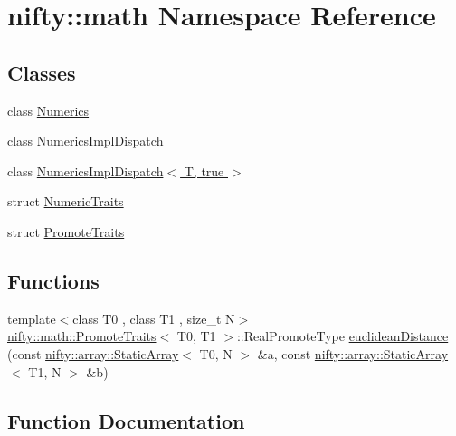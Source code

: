 \hypertarget{namespacenifty_1_1math}{}\section{nifty\+:\+:math Namespace Reference}
\label{namespacenifty_1_1math}
\subsection*{Classes}
\begin{DoxyCompactItemize}
\item 
class \hyperlink{classnifty_1_1math_1_1Numerics}{Numerics}
\item 
class \hyperlink{classnifty_1_1math_1_1NumericsImplDispatch}{Numerics\+Impl\+Dispatch}
\item 
class \hyperlink{classnifty_1_1math_1_1NumericsImplDispatch_3_01T_00_01true_01_4}{Numerics\+Impl\+Dispatch$<$ T, true $>$}
\item 
struct \hyperlink{structnifty_1_1math_1_1NumericTraits}{Numeric\+Traits}
\item 
struct \hyperlink{structnifty_1_1math_1_1PromoteTraits}{Promote\+Traits}
\end{DoxyCompactItemize}
\subsection*{Functions}
\begin{DoxyCompactItemize}
\item 
{\footnotesize template$<$class T0 , class T1 , size\+\_\+t N$>$ }\\\hyperlink{structnifty_1_1math_1_1PromoteTraits}{nifty\+::math\+::\+Promote\+Traits}$<$ T0, T1 $>$\+::Real\+Promote\+Type \hyperlink{namespacenifty_1_1math_a6abaaeb54bfe7300d2f3ae9186fe3ab0}{euclidean\+Distance} (const \hyperlink{namespacenifty_1_1array_a683f151f19c851754e0c6d55ed16a0c2}{nifty\+::array\+::\+Static\+Array}$<$ T0, N $>$ \&a, const \hyperlink{namespacenifty_1_1array_a683f151f19c851754e0c6d55ed16a0c2}{nifty\+::array\+::\+Static\+Array}$<$ T1, N $>$ \&b)
\end{DoxyCompactItemize}


\subsection{Function Documentation}
\hypertarget{namespacenifty_1_1math_a6abaaeb54bfe7300d2f3ae9186fe3ab0}{}
